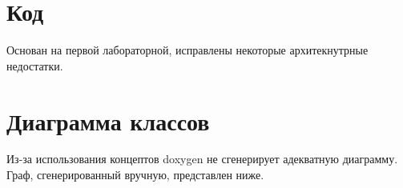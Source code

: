 \documentclass[russian, english]{article}
\begin{document}
\appendix
\section{Код}
Основан на первой лабораторной, исправлены некоторые архитекнутрные недостатки.

\section{Диаграмма классов}
Из-за использования концептов doxygen не сгенерирует адекватную диаграмму. Граф, сгенерированный вручную, представлен ниже. \\
\noindent{}
%
\end{document}

